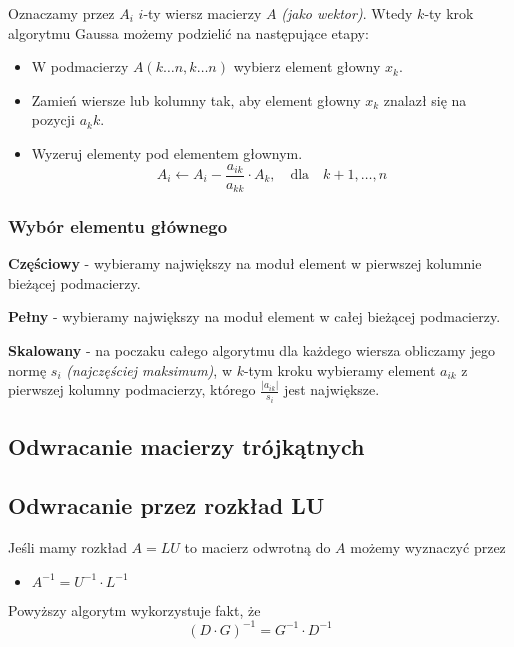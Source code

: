 \documentclass[../mn-notatki.tex]{subfiles}
\begin{document}
Oznaczamy przez $A_i$ $i$-ty wiersz macierzy $A$ \textit{(jako wektor)}.
Wtedy $k$-ty krok algorytmu Gaussa możemy podzielić na następujące etapy:
\begin{itemize}
    \item W podmacierzy $A(k\ldots n, k\ldots n)$ wybierz element głowny $x_k$.
    \item Zamień wiersze lub kolumny tak, aby element głowny $x_k$ znalazł się
    na pozycji $a_kk$.
    \item Wyzeruj elementy pod elementem głownym.
    \[
    A_i \leftarrow A_i - \frac{a_{ik}}{a_{kk}} \cdot A_k, \text{~~ dla ~~} k+1, \ldots, n
    \]
\end{itemize}

\subsubsection{Wybór elementu głównego}

\begin{tcolorbox}
\textbf{Częściowy} - wybieramy największy na moduł element w pierwszej kolumnie
bieżącej podmacierzy.
\end{tcolorbox}

\begin{tcolorbox}
\textbf{Pełny} - wybieramy największy na moduł element w całej
bieżącej podmacierzy.
\end{tcolorbox}

\begin{tcolorbox}
\textbf{Skalowany} - na poczaku całego algorytmu dla każdego wiersza obliczamy
jego normę $s_i$ \textit{(najczęściej maksimum)}, w $k$-tym kroku wybieramy
element $a_{ik}$ z pierwszej kolumny podmacierzy, którego
$\frac{|a_{ik}|}{s_i}$ jest największe.
\end{tcolorbox}

\subsection{Odwracanie macierzy trójkątnych}
\subsection{Odwracanie przez rozkład LU}

\begin{tcolorbox}
Jeśli mamy rozkład $A = LU$ to macierz odwrotną do $A$ możemy wyznaczyć przez
\begin{itemize}
    \item $A^{-1} = U^{-1} \cdot L^{-1}$
\end{itemize}
Powyższy algorytm wykorzystuje fakt, że
\[
(D\cdot G)^{-1} = G^{-1} \cdot D^{-1}
\]
\end{tcolorbox}
\end{document}
